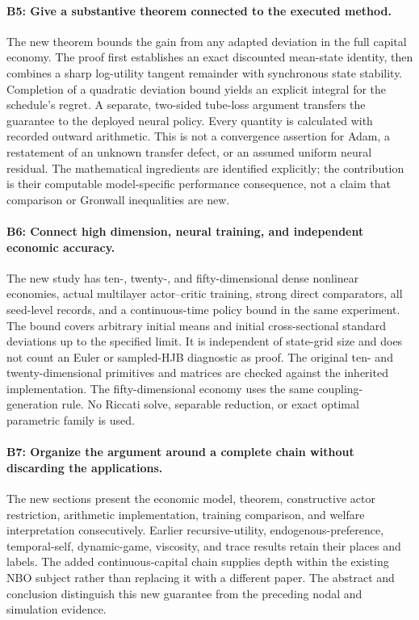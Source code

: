 \paragraph{B5: Give a substantive theorem connected to the executed method.}
The new theorem bounds the gain from any adapted deviation in the full capital economy. The proof first establishes an exact discounted mean-state identity, then combines a sharp log-utility tangent remainder with synchronous state stability. Completion of a quadratic deviation bound yields an explicit integral for the schedule's regret. A separate, two-sided tube-loss argument transfers the guarantee to the deployed neural policy. Every quantity is calculated with recorded outward arithmetic. This is not a convergence assertion for Adam, a restatement of an unknown transfer defect, or an assumed uniform neural residual. The mathematical ingredients are identified explicitly; the contribution is their computable model-specific performance consequence, not a claim that comparison or Gronwall inequalities are new.

\paragraph{B6: Connect high dimension, neural training, and independent economic accuracy.}
The new study has ten-, twenty-, and fifty-dimensional dense nonlinear economies, actual multilayer actor--critic training, strong direct comparators, all seed-level records, and a continuous-time policy bound in the same experiment. The bound covers arbitrary initial means and initial cross-sectional standard deviations up to the specified limit. It is independent of state-grid size and does not count an Euler or sampled-HJB diagnostic as proof. The original ten- and twenty-dimensional primitives and matrices are checked against the inherited implementation. The fifty-dimensional economy uses the same coupling-generation rule. No Riccati solve, separable reduction, or exact optimal parametric family is used.

\paragraph{B7: Organize the argument around a complete chain without discarding the applications.}
The new sections present the economic model, theorem, constructive actor restriction, arithmetic implementation, training comparison, and welfare interpretation consecutively. Earlier recursive-utility, endogenous-preference, temporal-self, dynamic-game, viscosity, and trace results retain their places and labels. The added continuous-capital chain supplies depth within the existing NBO subject rather than replacing it with a different paper. The abstract and conclusion distinguish this new guarantee from the preceding nodal and simulation evidence.

